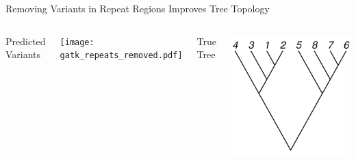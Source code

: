 \documentclass{beamer}
\begin{document}
\begin{frame}{Removing Variants in Repeat Regions Improves Tree Topology}
	\begin{columns}
		\begin{center}
		Predicted Variants
		\end{center}
		\texttt{[image: gatk\_repeats\_removed.pdf]}
		\begin{center}
		True Tree
		\end{center}
		\includegraphics[width=\linewidth,angle=90]{true_tree.pdf}
	\end{columns}
\end{frame}
\end{document}
